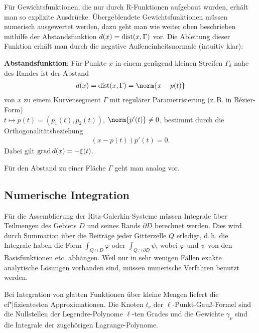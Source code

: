 \linie
\pagebreak

Für Gewichtsfunktionen, die nur durch R-Funktionen aufgebaut wurden, erhält man so explizite
Ausdrücke.
Übergeblendete Gewichtsfunktionen müssen numerisch ausgewertet werden,
dazu geht man wie weiter oben beschrieben mithilfe der Abstandsfunktion $d(x) = \operatorname{dist}(x, \Gamma)$
vor.
Die Ableitung dieser Funktion erhält man durch die negative Außeneinheitsnormale
(intuitiv klar):

\textbf{Abstandsfunktion}:
Für Punkte $x$ in einem genügend kleinen Streifen $\Gamma_\delta$ nahe des Randes ist der Abstand
\begin{align*}
    d(x) = \dist(x, \Gamma) = \norm{x - p(t)}
\end{align*}
von $x$ zu einem Kurvensegment $\Gamma$ mit regulärer Parametrisierung
(z.\,B. in Bézier-Form)\\
$t \mapsto p(t) = (p_1(t), p_2(t))$, $\norm{p'(t)} \not= 0$,
bestimmt durch die Orthogonalitätsbeziehung
\begin{align*}
    (x - p(t)) p'(t) = 0.
\end{align*}
Dabei gilt $\operatorname{grad} d(x) = -\xi(t)$.

Für den Abstand zu einer Fläche $\Gamma$ geht man analog vor.

\subsection{%
    Numerische Integration%
}

Für die Assemblierung der Ritz-Galerkin-Systeme müssen Integrale über Teilmengen des Gebiets $D$
und seines Rands $\partial D$ berechnet werden.
Dies wird durch Summation über die Beiträge jeder Gitterzelle $Q$ erledigt, d.\,h. die Integrale
haben die Form $\int_{Q \cap D} \varphi$ oder $\int_{Q \cap \partial D} \psi$,
wobei $\varphi$ und $\psi$ von den Basisfunktionen etc. abhängen.
Weil nur in sehr wenigen Fällen exakte analytische Lösungen vorhanden sind, müssen
numerische Verfahren benutzt werden.

Bei Integration von glatten Funktionen über kleine Mengen liefert
 die ef"|fizientesten Approximationen.
Die Knoten $t_\nu$ der $\ell$-Punkt-Gauß-Formel sind die Nullstellen der Legendre-Polynome
$\ell$-ten Grades und die Gewichte $\gamma_\nu$ sind die Integrale der zugehörigen
Lagrange-Polynome.

